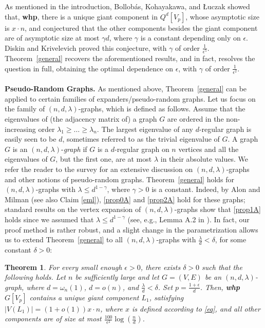 \documentclass[notitlepage]{scrartcl}
\newtheorem{theorem}{Theorem}
\begin{document}
As mentioned in the introduction, Bollob\'as, Kohayakawa, and \L uczak \cite{zbMATH00736289} showed that, \textbf{whp}, there is a unique giant component in $Q^d[V_p]$, whose asymptotic size is $x\cdot n$, and conjectured that the other components besides the giant component are of asymptotic size at most $\gamma d$, where $\gamma$ is a constant depending only on $\epsilon$. Diskin and Krivelevich \cite[Theorem 1.2]{zbMATH07770097} proved this conjecture, with $\gamma$ of order $\frac{1}{\epsilon^5}$.
Theorem~\ref{general} recovers the aforementioned results, and in fact, resolves the question in full, obtaining the optimal dependence on $\epsilon$, with $\gamma$ of order $\frac{1}{\epsilon^2}$.

\paragraph{}
\textbf{Pseudo-Random Graphs.} As mentioned above, Theorem~\ref{general} can be applied to certain families of expanders/pseudo-random graphs. Let us focus on the family of $(n, d, \lambda)$-graphs, which is defined as follows. Assume that the eigenvalues of (the adjacency matrix of) a graph $G$ are ordered in the non-increasing order $\lambda_1 \geq \dots \geq \lambda_n$. The largest eigenvalue of any $d$-regular graph is easily seen to be $d$, sometimes referred to as the trivial eigenvalue of $G$. A graph $G$ is an $(n, d, \lambda)$-\textit{graph} if $G$ is a $d$-regular graph on $n$ vertices and all the eigenvalues of $G$, but the first one, are at most $\lambda$ in their absolute values. We refer the reader to the survey \cite{zbMATH05037081} for an extensive discussion on $(n,d,\lambda)$-graphs and other notions of pseudo-random graphs. Theorem~\ref{general} holds for $(n, d, \lambda)$-graphs with $\lambda\le d^{1-\gamma}$, where $\gamma>0$ is a constant. Indeed, by Alon and Milman \cite{zbMATH03875335} (see also Claim \ref{eml}), \ref{prop0A} and \ref{prop2A} hold for these graphs; standard results on the vertex expansion of $(n,d,\lambda)$-graphs show that \ref{prop1A} holds since we assumed that $\lambda\le d^{1-\gamma}$ (see, e.g., Lemma A.2 in \cite{arXiv:2503.06826}). In fact, our proof method is rather robust, and a slight change in the parametrization allows us to extend Theorem~\ref{general} to all $(n,d,\lambda)$-graphs with $\frac{\lambda}{d}<\delta$, for some constant $\delta>0$:

\begin{theorem} \label{n,d,lambda}
    For every small enough $\epsilon>0$, there exists $\delta>0$ such that the following holds. Let $n$ be sufficiently large and let $G=(V,E)$ be an $(n,d,\lambda)$-graph, where $d=\omega_n(1)$, $d=o(n)$, and $\frac{\lambda}{d}<\delta$. Set $p=\frac{1+\epsilon}{d}$. Then, \textbf{whp} $G[V_p]$ contains a unique giant component $L_1$, satisfying $|V(L_1)| = (1 + o(1))x\cdot n$, where $x$ is defined according to \eqref{eq}, and all other components are of size at most $\frac{100}{\epsilon^2}\log \left(\frac{n}{d}\right)$.
\end{theorem}
\end{document}
